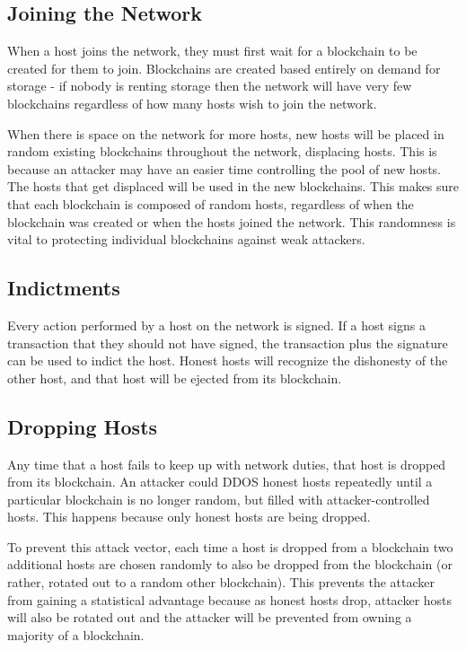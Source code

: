 \documentclass[a4paper,10pt]{article}
\begin{document}
\subsection{Joining the Network}
\par
	When a host joins the network, they must first wait for a blockchain to 
be created for them to join. Blockchains are created based entirely on demand 
for storage - if nobody is renting storage then the network will have very few 
blockchains regardless of how many hosts wish to join the network.
\par
When there is space on the network for more hosts, new hosts will be 
placed in random existing blockchains throughout the network, displacing hosts. 
This is because an attacker may have an easier time controlling the pool of new 
hosts. The hosts that get displaced will be used in the new blockchains. This 
makes sure that each blockchain is composed of random hosts, regardless of when 
the blockchain was created or when the hosts joined the network. This 
randomness is vital to protecting individual blockchains against weak attackers.
\subsection{Indictments}
\par
Every action performed by a host on the network is signed. If a host 
signs a transaction that they should not have signed, the transaction plus the 
signature can be used to indict the host. Honest hosts will recognize the 
dishonesty of the other host, and that host will be ejected from its blockchain.
\subsection{Dropping Hosts}
\par
Any time that a host fails to keep up with network duties, that host is 
dropped from its blockchain. An attacker could DDOS honest hosts repeatedly 
until a particular blockchain is no longer random, but filled with 
attacker-controlled hosts. This happens because only honest hosts are being 
dropped.
\par
To prevent this attack vector, each time a host is dropped from a 
blockchain two additional hosts are chosen randomly to also be dropped from the 
blockchain (or rather, rotated out to a random other blockchain). This prevents 
the attacker from gaining a statistical advantage because as honest hosts drop, 
attacker hosts will also be rotated out and the attacker will be prevented from 
owning a majority of a blockchain.
\end{document}
